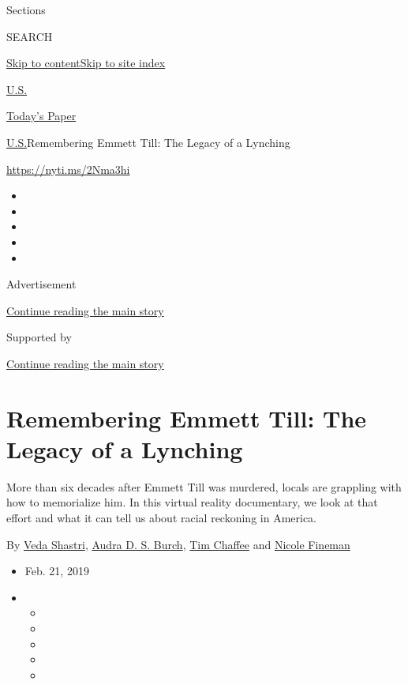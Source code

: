 Sections

SEARCH

\protect\hyperlink{site-content}{Skip to
content}\protect\hyperlink{site-index}{Skip to site index}

\href{https://www.nytimes.com/section/us}{U.S.}

\href{https://myaccount.nytimes.com/auth/login?response_type=cookie\&client_id=vi}{}

\href{https://www.nytimes.com/section/todayspaper}{Today's Paper}

\href{/section/us}{U.S.}\textbar{}Remembering Emmett Till: The Legacy of
a Lynching

\url{https://nyti.ms/2Nma3hi}

\begin{itemize}
\item
\item
\item
\item
\item
\end{itemize}

Advertisement

\protect\hyperlink{after-top}{Continue reading the main story}

Supported by

\protect\hyperlink{after-sponsor}{Continue reading the main story}

\hypertarget{remembering-emmett-till-the-legacy-of-a-lynching}{%
\section{Remembering Emmett Till: The Legacy of a
Lynching}\label{remembering-emmett-till-the-legacy-of-a-lynching}}

More than six decades after Emmett Till was murdered, locals are
grappling with how to memorialize him. In this virtual reality
documentary, we look at that effort and what it can tell us about racial
reckoning in America.

By \href{https://www.nytimes.com/by/veda-shastri}{Veda Shastri},
\href{https://www.nytimes.com/by/audra-d-s-burch}{Audra D. S. Burch},
\href{https://www.nytimes.com/by/tim-chaffee}{Tim Chaffee} and
\href{https://www.nytimes.com/by/nicole-fineman}{Nicole Fineman}

\begin{itemize}
\item
  Feb. 21, 2019
\item
  \begin{itemize}
  \item
  \item
  \item
  \item
  \item
  \end{itemize}
\end{itemize}

